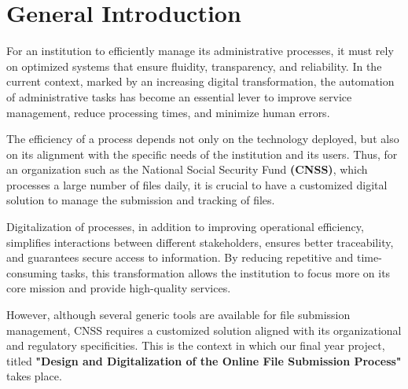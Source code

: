 \chapter*{General Introduction}
\raggedright
For an institution to efficiently manage its administrative processes, it must rely on optimized systems that ensure fluidity, transparency, and reliability. In the current context, marked by an increasing digital transformation, the automation of administrative tasks has become an essential lever to improve service management, reduce processing times, and minimize human errors.

\vspace{0.3cm}
The efficiency of a process depends not only on the technology deployed, but also on its alignment with the specific needs of the institution and its users. Thus, for an organization such as the National Social Security Fund \textbf{(CNSS)}, which processes a large number of files daily, it is crucial to have a customized digital solution to manage the submission and tracking of files.

\vspace{0.3cm}
Digitalization of processes, in addition to improving operational efficiency, simplifies interactions between different stakeholders, ensures better traceability, and guarantees secure access to information. By reducing repetitive and time-consuming tasks, this transformation allows the institution to focus more on its core mission and provide high-quality services.

\vspace{0.3cm}
However, although several generic tools are available for file submission management, CNSS requires a customized solution aligned with its organizational and regulatory specificities. This is the context in which our final year project, titled \textbf{"Design and Digitalization of the Online File Submission Process"} takes place.

